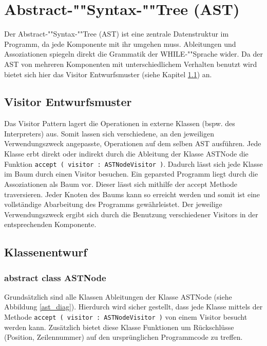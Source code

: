 \section{Abstract-""Syntax-""Tree (AST)}

\begin{landscape}

Der Abstract-""Syntax-""Tree (AST) ist eine zentrale Datenstruktur im Programm, da jede Komponente mit ihr umgehen muss. Ableitungen und Assoziationen spiegeln direkt die Grammatik der WHILE-""Sprache wider. Da der AST von mehreren Komponenten mit unterschiedlichem Verhalten benutzt wird bietet sich hier das Visitor Entwurfsmuster (siehe Kapitel \ref{astvisitor_sec}) an.

\subsection{Visitor Entwurfsmuster}
\label{astvisitor_sec}
Das Visitor Pattern lagert die Operationen in externe Klassen (bspw. des Interpreters) aus. Somit lassen sich verschiedene, an den jeweiligen Verwendungszweck angepasste, Operationen auf dem selben AST ausführen. Jede Klasse erbt direkt oder indirekt durch die Ableitung der Klasse ASTNode die Funktion \texttt{accept ( visitor : ASTNodeVisitor )}. Dadurch lässt sich jede Klasse im Baum durch einen Visitor besuchen.
Ein geparsted Programm liegt durch die Assoziationen als Baum vor. Dieser lässt sich mithilfe der accept Methode traversieren. Jeder Knoten des Baums kann so erreicht werden und somit ist eine vollständige Abarbeitung des Programms gewährleistet. Der jeweilige Verwendungszweck ergibt sich durch die Benutzung verschiedener Visitors in der entsprechenden Komponente. 

\subsection{Klassenentwurf}
\subsubsection{abstract class ASTNode}
\label{astnode_class}
Grundsätzlich sind alle Klassen Ableitungen der Klasse ASTNode (siehe Abbildung \ref{ast_diag}). Hierdurch wird sicher gestellt, dass jede Klasse mittels der Methode \texttt{accept ( visitor : ASTNodeVisitor )} von einem Visitor besucht werden kann. Zusätzlich bietet diese Klasse Funktionen um Rückschlüsse (Position, Zeilennummer) auf den ursprünglichen Programmcode zu treffen.


\end{landscape}
